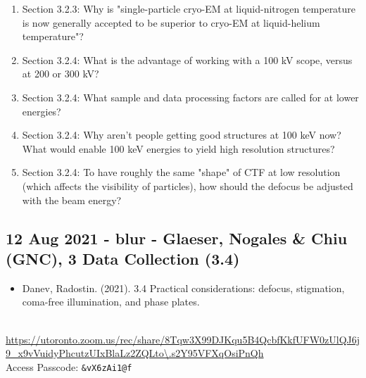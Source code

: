 \documentclass[11pt, oneside]{article}   	%
\begin{document}
\begin{enumerate}
	\item Section 3.2.3: Why is "single-particle cryo-EM at liquid-nitrogen temperature is now generally accepted to be superior to cryo-EM at liquid-helium temperature"?
	\item Section 3.2.4: What is the advantage of working with a 100 kV scope, versus at 200 or 300 kV? 
	\item Section 3.2.4: What sample and data processing factors are called for at lower energies?
	\item Section 3.2.4: Why aren't people getting good structures at 100 keV now? What would enable 100 keV energies to yield high resolution structures?
	\item Section 3.2.4: To have roughly the same "shape" of CTF at low resolution (which affects the visibility of particles), how should the defocus be adjusted with the beam energy?
\end{enumerate}

\subsection{12 Aug 2021 - blur - Glaeser, Nogales \& Chiu (GNC), 3 Data Collection (3.4)}
\begin{itemize}
	\item Danev, Radostin. (2021). 3.4 Practical considerations: defocus, stigmation, coma-free illumination, and phase plates.
\end{itemize}
 \\
{\tiny \url{https://utoronto.zoom.us/rec/share/8Tqw3X99DJKqu5B4QcbfKkfUFW0zUlQJ6j9\_x9vVuidyPhcutzUIxBlaLz2ZQLto\.s2Y95VFXqOsiPnQh}} \\
Access Passcode: \texttt{\&vX6zAi1@f}
\end{document}
